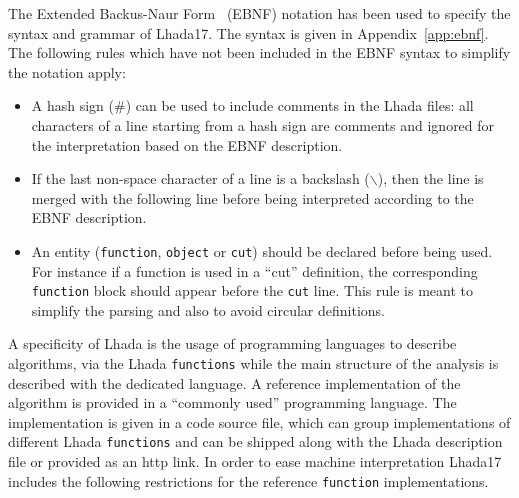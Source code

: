 \documentclass[11pt]{cernrep}
\begin{document}
The Extended Backus-Naur Form~\cite{bib:ebnf,bib:ebnf-wiki} (EBNF) notation has been used to specify the syntax and grammar of {\sc Lhada}17. The syntax is given in Appendix~\ref{app:ebnf}. The following rules which have not been included in the EBNF syntax to simplify the notation apply:
\begin{itemize}
\item A hash sign (\#) can be used to include comments in the {\sc Lhada} files: all characters of a line starting from a hash sign are comments and ignored for the interpretation based on the EBNF description.
\item If the last non-space character of a line is a backslash ($\backslash$), then the line is merged with the following line before being interpreted according to the EBNF description.
\item An entity ({\tt function}, {\tt object}  or {\tt cut}) should be declared before being used. For instance if a function is used in a ``cut'' definition, the corresponding {\tt function} block should appear before the {\tt cut} line. This rule is meant to simplify the parsing and also to avoid circular definitions. 
\end{itemize}

A specificity of {\sc Lhada} is the usage of programming languages to describe algorithms, via the {\sc Lhada} {\tt functions} while the main structure of the analysis is described with the dedicated language. A reference implementation of the algorithm is provided in a ``commonly used'' programming language. The implementation is given in a code source file, which can group implementations of different {\sc Lhada} {\tt functions} and can be shipped along with the {\sc Lhada} description file or provided as an http link.  In order to ease machine interpretation {\sc Lhada}17 includes the following restrictions for the reference {\tt function} implementations.
\end{document}

